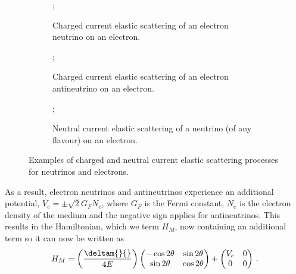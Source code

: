 \begin{figure}[h]
  \begin{subfigure}[t]{0.32\textwidth}
    \centering
    ;
    \caption{Charged current elastic scattering of an electron neutrino on an electron.}
    \label{fig:coherentScattering:nue}
  \end{subfigure}
  \hfill
  \begin{subfigure}[t]{0.32\textwidth}
    ;
    \caption{Charged current elastic scattering of an electron antineutrino on an electron.}
    \label{fig:coherentScattering:anue}
  \end{subfigure}
  \begin{subfigure}[t]{0.32\textwidth}
    \centering
    ;
    \caption{Neutral current elastic scattering of a neutrino (of any flavour) on an electron.}
    \label{fig:coherentScattering:nul}
  \end{subfigure}
  \caption[Neutrino elastic scattering processes.]{Examples of charged and neutral current elastic scattering processes for neutrinos and electrons.}
  \label{fig:coherentScattering}
\end{figure}

As a result, electron neutrinos and antineutrinos experience an additional potential, $V_{e} = \pm \sqrt{2} G_{F} N_{e}$, where $G_{F}$ is the Fermi constant, $N_{e}$ is the electron density of the medium and the negative sign applies for antineutrinos.
This results in the Hamiltonian, which we term $H_{M}$, now containing an additional term so it can now be written as
\begin{equation}
  H_{M} =  \left( \frac{\deltam{}{}}{4E} \right)
  \begin{pmatrix}
    -\cos 2\theta & \sin 2\theta \\
    \sin 2\theta & \cos 2\theta
  \end{pmatrix}
  +
  \begin{pmatrix}
    V_{e} & 0 \\
    0 & 0
  \end{pmatrix} \, .
\end{equation}

